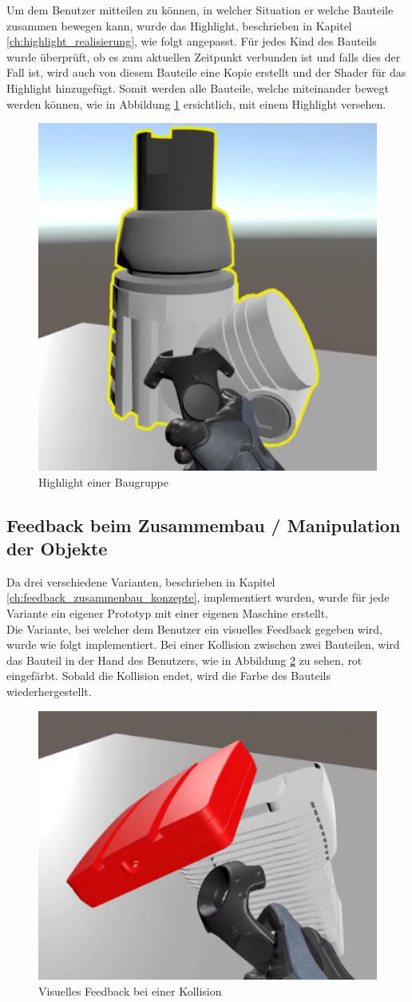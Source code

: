 \noindent Um dem Benutzer mitteilen zu können, in welcher Situation er welche Bauteile zusammen bewegen kann, wurde das Highlight, beschrieben in Kapitel \ref{ch:highlight_realisierung}, wie folgt angepasst. Für jedes Kind des Bauteils wurde überprüft, ob es zum aktuellen Zeitpunkt verbunden ist und falls dies der Fall ist, wird auch von diesem Bauteile eine Kopie erstellt und der Shader für das Highlight hinzugefügt. Somit werden alle Bauteile, welche miteinander bewegt werden können, wie in Abbildung \ref{fig:highlight_baugruppe} ersichtlich, mit einem Highlight versehen.

\begin{figure}[h!]
	\centering
	\includegraphics[keepaspectratio,width=0.4\linewidth]{img/Baugruppe_Highlight.PNG}
	\caption{Highlight einer Baugruppe}
	\label{fig:highlight_baugruppe}
\end{figure}

\subsection{Feedback beim Zusammembau / Manipulation der Objekte}
\label{ch:feedback_zusammenbau_manipulation}

Da drei verschiedene Varianten, beschrieben in Kapitel \ref{ch:feedback_zusammenbau_konzepte}, implementiert wurden, wurde für jede Variante ein eigener Prototyp mit einer eigenen Maschine erstellt. \\

\noindent Die Variante, bei welcher dem Benutzer ein visuelles Feedback gegeben wird, wurde wie folgt implementiert. Bei einer Kollision zwischen zwei Bauteilen, wird das Bauteil in der Hand des Benutzers, wie in Abbildung \ref{fig:kollision_variante_1} zu sehen, rot eingefärbt. Sobald die Kollision endet, wird die Farbe des Bauteils wiederhergestellt.

\begin{figure}[h!]
	\centering
	\includegraphics[keepaspectratio,width=0.4\linewidth]{img/Kollision_Variante1.PNG}
	\caption{Visuelles Feedback bei einer Kollision}
	\label{fig:kollision_variante_1}
\end{figure}

